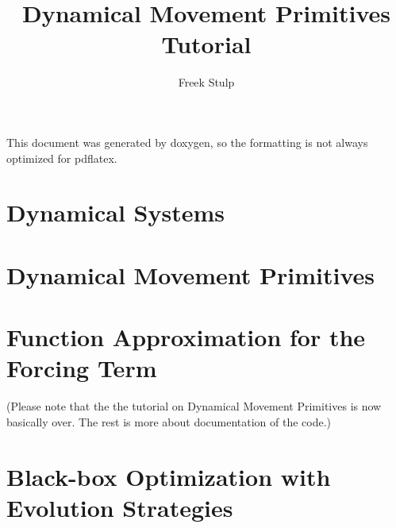 \documentclass[a4paper,11pt]{book}
\author{Freek Stulp}
\title{Dynamical Movement Primitives Tutorial}
\begin{document}
\maketitle

This document was generated by doxygen, so the formatting is not always optimized for pdflatex.

\setcounter{tocdepth}{2}
\tableofcontents

\newpage



%
%

\chapter{Dynamical Systems}


\chapter{Dynamical Movement Primitives}







\chapter{Function Approximation for the Forcing Term}

(Please note that the the tutorial on Dynamical Movement Primitives is now basically over. The rest is more about documentation of the code.)



\chapter{Black-box Optimization with Evolution Strategies}



%
%
\end{document}
